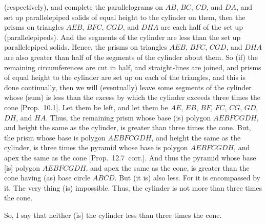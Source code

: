 \begin{Parallel}{}{}
{(respectively), and complete the parallelograms on $AB$, $BC$, $CD$, and $DA$, and set up parallelepiped solids
of equal height to the cylinder on them, then the prisms on triangles $AEB$, $BFC$, $CGD$, and $DHA$ are each half
of the set up (parallelepipeds). And the segments of the cylinder are less than the set up parallelepiped solids. 
Hence, the prisms on triangles $AEB$, $BFC$, $CGD$, and $DHA$ are also greater than half of the segments
of the cylinder about them. So (if) the remaining circumferences are cut in half, and straight-lines are joined,
and prisms of equal height to the cylinder are set up on each of the triangles, and this is done
continually,  then we will (eventually) leave some segments of the cylinder whose (sum) is less than the excess by which the
cylinder exceeds three times the cone [Prop.~10.1]. Let them be left, and let them be $AE$, $EB$, $BF$, $FC$, $CG$,
$GD$, $DH$, and $HA$. Thus, the remaining prism whose base (is) polygon $AEBFCGDH$, and height  the
same as the cylinder, is greater than three times the cone. But, the prism whose base is polygon $AEBFCGDH$,
and height the same as the cylinder,  is three times the pyramid whose base is polygon $AEBFCGDH$, and
apex the same as the cone [Prop.~12.7~corr.]. And thus the pyramid whose base [is] polygon 
$AEBFCGDH$, and apex the same as the cone, is greater than the cone having (as) base circle $ABCD$. But (it is)
also less. For it is encompassed by it. The very thing (is) impossible. Thus, the cylinder is not more than
three times the cone.

So, I say that neither (is) the cylinder less than three times the cone.

}
\end{Parallel}
